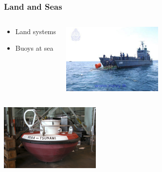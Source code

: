\documentclass[serif,mathserif]{beamer}
\begin{document}
\begin{frame}
  \frametitle{Land and Seas}
\begin{columns}
\begin{center}
\begin{itemize}
 \item Land systems
 \item Buoys at sea
\end{itemize}
\end{center}

\begin{center}
 \includegraphics[width=5cm]{Sri-Lanka-Navy-Divers-Place-Buoys-in-Back-Bay}
\end{center}
\end{columns}
 \includegraphics[width=5cm]{dart-buoy-ndbc-03-30-2006}
\end{frame}

\end{document}
